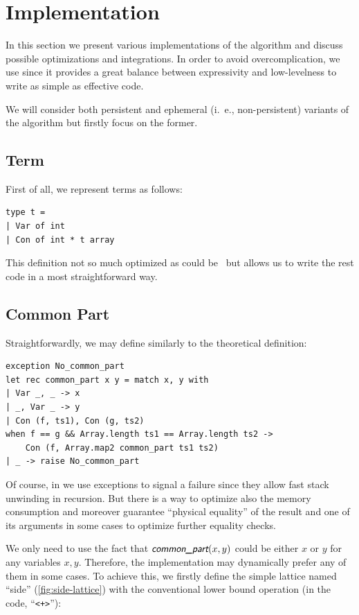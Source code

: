 \section{Implementation}

In this section we present various implementations of the algorithm and discuss possible optimizations and integrations. In order to avoid overcomplication, we use \OCaml since it provides a great balance between expressivity and low-levelness to write as simple as effective code.

We will consider both persistent and ephemeral (i.~e., non-persistent) variants of the algorithm but firstly focus on the former.


\subsection{Term}

First of all, we represent terms as follows:
\begin{verbatim}
type t =
| Var of int
| Con of int * t array
\end{verbatim}

This definition not so much optimized as could be~\cite{kosarev2018typed} but allows us to write the rest code in a most straightforward way.


\subsection{Common Part}

Straightforwardly, we may define \commonpart similarly to the theoretical definition:
\begin{verbatim}
exception No_common_part
let rec common_part x y = match x, y with
| Var _, _ -> x
| _, Var _ -> y
| Con (f, ts1), Con (g, ts2)
when f == g && Array.length ts1 == Array.length ts2 ->
    Con (f, Array.map2 common_part ts1 ts2)
| _ -> raise No_common_part
\end{verbatim}

Of course, in \OCaml we use exceptions to signal a failure since they allow fast stack unwinding in recursion. But there is a way to optimize also the memory consumption and moreover guarantee ``physical equality'' of the \commonpart result and one of its arguments in some cases to optimize further equality checks.

We only need to use the fact that $\commonpart(x, y)$ could be either $x$ or $y$ for any variables $x, y$. Therefore, the implementation may dynamically prefer any of them in some cases. To achieve this, we firstly define the simple lattice named ``side'' (\autoref{fig:side-lattice}) with the conventional lower bound operation (in the code, ``\texttt{<+>}''):

